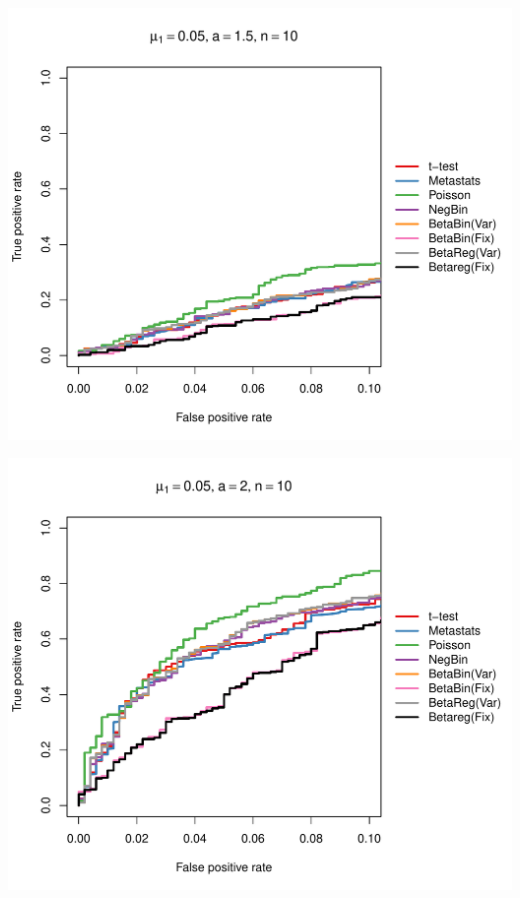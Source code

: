 \documentclass[12pt]{article}\usepackage{graphicx, color}
\makeatletter
\def\maxwidth{ %
  \ifdim\Gin@nat@width>\linewidth
    \linewidth
  \else
    \Gin@nat@width
  \fi
}
\newenvironment{knitrout}{}{} %
\makeatother
\begin{document}
\begin{knitrout}
{\centering \includegraphics[width=\maxwidth]{figure/rocs55} 

}




{\centering \includegraphics[width=\maxwidth]{figure/rocs56} 

}





\end{knitrout}
\end{document}
